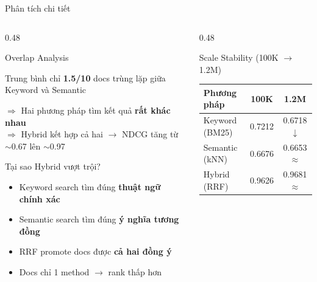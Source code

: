 \begin{frame}{Phân tích chi tiết}
\begin{columns}[T]
\begin{column}{0.48\textwidth}

\begin{block}{Overlap Analysis}
{\footnotesize
Trung bình chỉ \textbf{1.5/10} docs trùng lặp giữa Keyword và Semantic

\vspace{0.05cm}
$\Rightarrow$ Hai phương pháp tìm kết quả \textbf{rất khác nhau}\\
$\Rightarrow$ Hybrid kết hợp cả hai $\to$ NDCG tăng từ $\sim$0.67 lên $\sim$0.97
}
\end{block}

\vspace{0.05cm}

\begin{exampleblock}{Tại sao Hybrid vượt trội?}
{\scriptsize
\begin{itemize}\itemsep0pt \parskip0pt 
    \item Keyword search tìm đúng \textbf{thuật ngữ chính xác}
    \item Semantic search tìm đúng \textbf{ý nghĩa tương đồng}
    \item RRF promote docs được \textbf{cả hai đồng ý}
    \item Docs chỉ 1 method $\to$ rank thấp hơn
\end{itemize}
}
\end{exampleblock}

\end{column}
\begin{column}{0.48\textwidth}

\begin{block}{Scale Stability (100K $\to$ 1.2M)}
\centering
\renewcommand{\arraystretch}{1.0}
{\scriptsize
\begin{tabular}{l c c}
\toprule
\textbf{Phương pháp} & \textbf{100K} & \textbf{1.2M} \\
\midrule
Keyword (BM25) & 0.7212 & 0.6718 {\scriptsize\textcolor{accentRed}{$\downarrow$}} \\
Semantic (kNN) & 0.6676 & 0.6653 {\scriptsize\textcolor{textMuted}{$\approx$}} \\
\rowcolor{highlightRow}
\textcolor{accentTeal}{Hybrid (RRF)} & \textcolor{accentTeal}{0.9626} & \textcolor{accentTeal}{0.9681} {\scriptsize\textcolor{accentTeal}{$\approx$}} \\
\bottomrule
\end{tabular}
}
\end{block}


\end{column}
\end{columns}
\end{frame}
